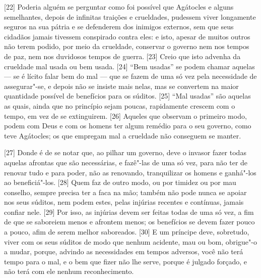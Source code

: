{[}22{]} Poderia alguém se perguntar como foi possível que Agátocles e
alguns semelhantes, depois de infinitas traições e crueldades, pudessem
viver longamente seguros na sua pátria e se defenderem dos inimigos
externos, sem que seus cidadãos jamais tivessem conspirado contra eles:
e isto, apesar de muitos outros não terem podido, por meio da crueldade,
conservar o governo nem nos tempos de paz, nem nos duvidosos tempos de
guerra. {[}23{]} Creio que isto advenha da crueldade mal usada ou bem
usada. {[}24{]} ``Bem usadas'' se podem chamar aquelas --- se é lícito
falar bem do mal --- que se fazem de uma só vez pela
necessidade de assegurar"-se, e depois não se insiste mais nelas, mas se
convertem na maior quantidade possível de benefícios para os súditos.
{[}25{]} ``Mal usadas'' são aquelas as quais, ainda que no princípio
sejam poucas, rapidamente crescem com o tempo, em vez de se extinguirem.
{[}26{]} Aqueles que observam o primeiro modo, podem com Deus e com os
homens ter algum remédio para o seu governo, como teve Agátocles; os que
empregam mal a crueldade não conseguem se manter.

{[}27{]} Donde é de se notar que, ao pilhar um governo, deve o invasor
fazer todas aquelas afrontas que são necessárias, e fazê"-las de uma só
vez, para não ter de renovar tudo e para poder, não as renovando,
tranquilizar os homens e ganhá"-los ao beneficiá"-los. {[}28{]} Quem faz
de outro modo, ou por timidez ou por mau conselho, sempre precisa ter a
faca na mão; também não pode nunca se apoiar nos seus súditos, nem podem
estes, pelas injúrias recentes e contínuas, jamais confiar nele.
{[}29{]} Por isso, as injúrias devem ser feitas todas de uma só vez, a
fim de que se saboreiem menos e afrontem menos; os benefícios se devem
fazer pouco a pouco, afim de serem melhor saboreados. {[}30{]} E um
príncipe deve, sobretudo, viver com os seus súditos de modo que nenhum
acidente, mau ou bom, obrigue"-o a mudar, porque, advindo as necessidades
em tempos adversos, você não terá tempo para o mal, e o bem que fizer
não lhe serve, porque é julgado forçado, e não terá com ele nenhum
reconhecimento.


